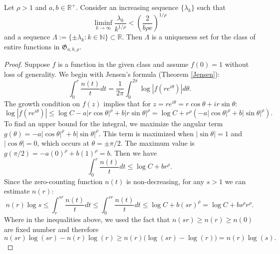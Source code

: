 \documentclass[graybox]{svmult}
\newcommand{\R}{\mathbb{R}}
\newcommand{\N}{\mathbb{N}}
\newcommand{\fG}{\mathfrak{G}}
\begin{document}
\begin{proposition}\label{UniquenessSet}
    Let $\rho > 1$ and $a,b \in \R^+$. Consider an increasing sequence $\{ \lambda_k \}$ such that
    \begin{equation*}
        \liminf_{k \to \infty} \frac{\lambda_k}{k^{1/\rho}} < \left( \frac{2}{b\rho e} \right)^{1/\rho} 
    \end{equation*}
    and a sequence $\Lambda := \{ \pm \lambda_k: k \in \N \} \subset \R$. Then $\Lambda$ is a uniqueness set for the class of entire functions in $\fG_{a,b,\rho}$.
\end{proposition}

\begin{proof}
    Suppose $f$ is a function in the given class and assume $f(0)=1$ without loss of generality. We begin with Jensen's formula (Theorem \ref{Jensen}):
    \begin{equation*}
        \int_0^r \frac{n(t)}{t}dt = \frac{1}{2\pi} \int_0^{2\pi}\log |f(re^{i\theta})|d\theta. 
    \end{equation*}
    The growth condition on $f(z)$ implies that for $z = re^{i\theta} = r\cos\theta + ir\sin\theta$:
    \begin{equation*}
        \log|f(re^{i\theta})| \le \log C - a|r\cos\theta|^\rho + b|r\sin\theta|^\rho = \log C + r^\rho(-a|\cos\theta|^\rho + b|\sin\theta|^\rho).
    \end{equation*}
    To find an upper bound for the integral, we maximize the angular term $g(\theta) = -a|\cos\theta|^\rho + b|\sin\theta|^\rho$. This term is maximized when $|\sin\theta|=1$ and $|\cos\theta|=0$, which occurs at $\theta = \pm \pi/2$. The maximum value is $g(\pi/2) = -a(0)^\rho + b(1)^\rho = b$. Then we have
    \begin{equation*}
        \int_0^r \frac{n(t)}{t}dt \le \log C + br^\rho.
    \end{equation*}
    Since the zero-counting function $n(t)$ is non-decreasing, for any $s>1$ we can estimate $n(r)$:
    \begin{equation*}
        n(r) \log s \le \int_r^{sr} \frac{n(t)}{t}dt \le \int_0^{sr} \frac{n(t)}{t}dt \le \log C + b(sr)^\rho = \log C + bs^\rho r^\rho. 
    \end{equation*}
    Where in the inequalities above, we used the fact that $n(sr)\geq n(r) \geq n(0)$ are fixed number and therefore 
    \begin{equation*}
        n(sr)\log(sr)-n(r)\log(r)\geq n(r)\big(\log(sr)- \log(r)\big) = n(r)\log(s).
    \end{equation*}

\end{proof}
\end{document}
